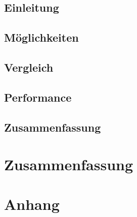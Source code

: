 \section{Einleitung}
\section{Möglichkeiten}
\section{Vergleich}
\section{Performance}
\section{Zusammenfassung}

\chapter{Zusammenfassung}


\seAppendix{}

\setcounter{page}{8}

\chapter{Anhang}

